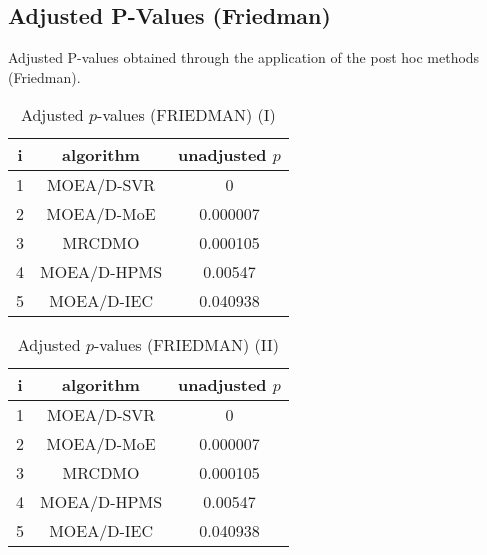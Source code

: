 \documentclass[a4paper,10pt]{article}
\begin{document}
\begin{landscape}
\section{Adjusted P-Values (Friedman)}


Adjusted P-values obtained through the application of the post hoc methods (Friedman).

\begin{table}[!htp]
\centering\small
\begin{tabular}{ccc}
i&algorithm&unadjusted $p$\\
\hline1& MOEA/D-SVR&0\\2& MOEA/D-MoE&0.000007\\3& MRCDMO&0.000105\\4&MOEA/D-HPMS&0.00547\\5& MOEA/D-IEC&0.040938\\\hline
\end{tabular}
\caption{Adjusted $p$-values (FRIEDMAN) (I)}
\end{table}
\begin{table}[!htp]
\centering\small
\begin{tabular}{ccc}
i&algorithm&unadjusted $p$\\
\hline1& MOEA/D-SVR&0\\2& MOEA/D-MoE&0.000007\\3& MRCDMO&0.000105\\4&MOEA/D-HPMS&0.00547\\5& MOEA/D-IEC&0.040938\\\hline
\end{tabular}
\caption{Adjusted $p$-values (FRIEDMAN) (II)}
\end{table}

\newpage
\end{landscape}
\end{document}
